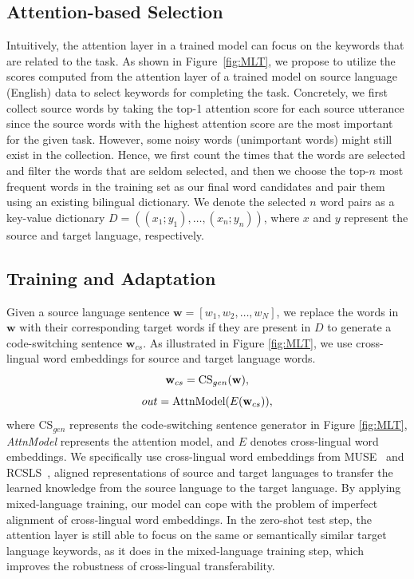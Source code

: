 \documentclass[letterpaper]{article} %
\begin{document}
\subsection{Attention-based Selection}
Intuitively, the attention layer in a trained model can focus on the keywords that are related to the task. As shown in Figure~\ref{fig:MLT}, we propose to utilize the scores computed from the attention layer of a trained model on source language (English) data to select keywords for completing the task.
Concretely, we first collect source words by taking the top-1 attention score for each source utterance since the source words with the highest attention score are the most important for the given task. However, some noisy words (unimportant words) might still exist in the collection. Hence, we first count the times that the words are selected and filter the words that are seldom selected, and then we choose the top-$n$ most frequent words in the training set as our final word candidates and pair them using an existing bilingual dictionary. We denote the selected $n$ word pairs as a key-value dictionary $D =  ((x_1;y_1),\dots,(x_n;y_n))$, where $x$ and $y$ represent the source and target language, respectively.

\subsection{Training and Adaptation}

Given a source language sentence $\mathbf{w}=[w_1,w_2,\dots,w_N]$, we replace the words in $\mathbf{w}$ with their corresponding target words if they are present in $D$ to generate a code-switching sentence $\mathbf{w}_{cs}$.
As illustrated in Figure \ref{fig:MLT}, we use cross-lingual word embeddings for source and target language words.
\begin{equation}
    \mathbf{w}_{cs} = \textnormal{CS}_{gen}(\mathbf{w}),
\end{equation}
\begin{equation}
    out = \textnormal{AttnModel}(E(\mathbf{w}_{cs})),
\end{equation}
where CS$_{gen}$ represents the code-switching sentence generator in Figure \ref{fig:MLT}, \textit{AttnModel} represents the attention model, and $E$ denotes cross-lingual word embeddings. We specifically use cross-lingual word embeddings from MUSE~\cite{conneau2017word} and RCSLS~\cite{joulin2018loss}, aligned representations of source and target languages to transfer the learned knowledge from the source language to the target language. By applying mixed-language training, our model can cope with the problem of imperfect alignment of cross-lingual word embeddings. In the zero-shot test step, the attention layer is still able to focus on the same or semantically similar target language keywords, as it does in the mixed-language training step, which improves the robustness of cross-lingual transferability.
\end{document}
